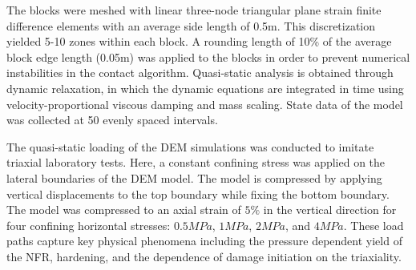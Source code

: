 The blocks were meshed with linear three-node triangular plane strain finite difference elements with an average side length of 0.5m. This discretization yielded 5-10 zones within each block. A rounding length of 10\% of the average block edge length (0.05m) was applied to the blocks in order to prevent numerical instabilities in the contact algorithm. Quasi-static analysis is obtained through dynamic relaxation, in which the dynamic equations are integrated in time using velocity-proportional viscous damping and mass scaling. State data of the model was collected at 50 evenly spaced intervals. 

The quasi-static loading of the DEM simulations was conducted to imitate triaxial laboratory tests. Here, a constant confining stress was applied on the lateral boundaries of the DEM model. The model is compressed by applying vertical displacements to the top boundary while fixing the bottom boundary. The model was compressed to an axial strain of $5\%$ in the vertical direction for four confining horizontal stresses: $0.5MPa$, $1MPa$, $2MPa$, and $4MPa$. These load paths capture key physical phenomena including the pressure dependent yield of the NFR, hardening, and the dependence of damage initiation on the triaxiality. 


